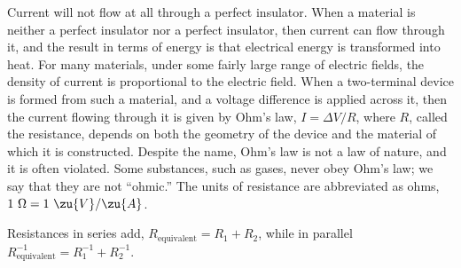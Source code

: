Current will not flow at all through a perfect insulator.
When a material is neither a perfect insulator nor a perfect insulator,
then current can flow through it, and the result in terms of energy
is that electrical energy is transformed into heat. For many materials,
under some fairly large range of electric fields, the density of current
is proportional to the electric field. When a two-terminal device is formed
from such a material, and a voltage difference is applied across it, then
the current flowing through it is given by Ohm's law, $I=\Delta V/R$, where
$R$, called the resistance, depends on both the geometry of the device and
the material of which it is constructed. Despite the name, Ohm's law is
not a law of nature, and it is often violated. Some substances, such as
gases, never obey Ohm's law; we say that they are not ``ohmic.'' The
units of resistance are abbreviated as ohms, $1\ \Omega=1\ \zu{V}/\zu{A}$.



Resistances in series add, $R_\text{equivalent}=R_1+R_2$, 
while in parallel 
$R_\text{equivalent}^{-1}=R_1^{-1}+R_2^{-1}$.
